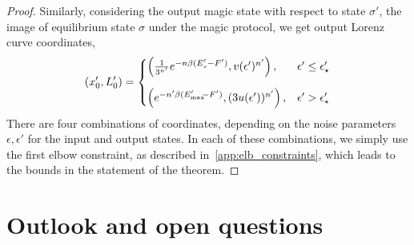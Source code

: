 \documentclass[pra,
aps,
twocolumn,
superscriptaddress,
groupedaddress,
nofootinbib,
reprint
]{revtex4-1}
\begin{document}
\begin{proof}
Similarly, considering the output magic state with respect to state $\sigma'$, the image of equilibrium state $\sigma$ under the magic protocol, we get output Lorenz curve coordinates,
\begin{equation}\label{eq:transformed_first_elb_coords}
	(x'_0, L'_0) =
	\begin{cases}
		\left(\frac{1}{3^{n'}} e^{-n\beta (E'_s - F')}, v(\epsilon')^{n'} \right), &\epsilon' \leq \epsilon'_\star \vspace{10pt}\\
		\left( e^{-n'\beta (E'_{\rm{max}}\hspace{-2.5pt}-F')}, (3u(\epsilon'))^{n'} \right), &\epsilon' > \epsilon'_\star
	\end{cases}
\end{equation}
There are four combinations of coordinates, depending on the noise parameters $\epsilon, \epsilon'$ for the input and output states.
In each of these combinations, we simply use the first elbow constraint, as described in~\cref{app:elb_constraints}, which leads to the bounds in the statement of the theorem.

\end{proof}



\section{Outlook and open questions}
\label{sec:lower_bounds}
\end{document}
